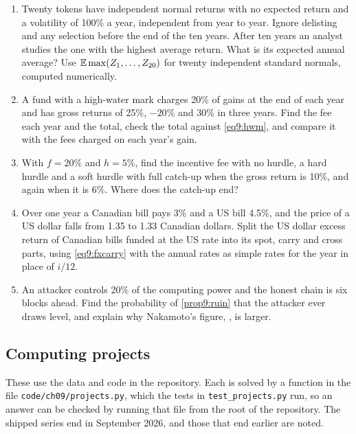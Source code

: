 \begin{chapterrefs}
\begin{enumerate}[label=\textbf{9.\arabic*}, leftmargin=*, ref=9.\arabic*]
  its starting assets and then 20\% of the remaining gain, with no hurdle and a high-water mark at the
  starting value. Find the
  investor's return and excess return, and the share of the gross excess return the investor keeps.
  \item\label{exr9:ten} Twenty tokens have independent normal returns with no expected return and a
  volatility of 100\% a year, independent from year to year. Ignore delisting and any selection before
  the end of the ten years. After ten years an analyst studies the one with the highest average
  return. What is its expected annual average? Use $\mathbb{E}\max(Z_1,\dots,Z_{20})$ for twenty independent
  standard normals, computed numerically.
  \item\label{exr9:eleven} A fund with a high-water mark charges 20\% of gains at the end of each year and
  has gross returns of 25\%, $-20$\% and 30\% in three years. Find the fee each year and the total, check
  the total against \cref{eq9:hwm}, and compare it with the fees charged on each year's gain.
  \item\label{exr9:twelve} With $f=20\%$ and $h=5\%$, find the incentive fee with no hurdle, a hard hurdle and a soft
  hurdle with full catch-up when the gross return is 10\%, and again when it is 6\%. Where does the
  catch-up end?
  \item\label{exr9:thirteen} Over one year a Canadian bill pays 3\% and a US bill 4.5\%, and the price of a US dollar falls
  from 1.35 to 1.33 Canadian dollars. Split the US dollar excess return of Canadian bills funded at the
  US rate into its spot, carry and cross parts, using \cref{eq9:fxcarry} with the annual rates as
  simple rates for the year in place of $i/12$.
  \item\label{exr9:fourteen} An attacker controls 20\% of the computing power and the honest chain is six blocks
  ahead. Find the probability of \cref{prop9:ruin} that the attacker ever draws level, and explain why
  Nakamoto's figure, \exNNak, is larger.
\end{enumerate}

\subsection*{Computing projects}
\label{sec9:projects}
These use the data and code in the repository. Each is solved by a function in the file
\texttt{code/ch09/projects.py}, which the tests in \texttt{test\_projects.py} run, so an answer
can be checked by running that file from the root of the repository. The shipped series end in
September 2026, and those that end earlier are noted.


\end{chapterrefs}
